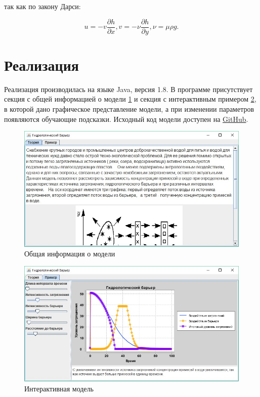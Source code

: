 		так как по закону Дарси:
		
		\begin{equation}
			u=-v\frac{\partial h}{\partial x}, v=-\nu\frac{\partial h}{\partial y}, \nu=\mu\rho g.
		\end{equation}
	\section{Реализация}
	
		Реализация производилась на языке Java, версия 1.8. В программе присутствует секция с общей информацией о модели \ref{fig:barriertheory} и секция с интерактивным примером \ref{fig:barrierexample}, в которой дано графическое представление модели, а при изменении параметров появляются обучающие подсказки. Исходный код модели доступен на \href{https://github.com/goto1134/mathmodels}{GitHub}.
		
		\begin{figure}[th]
			\centering
			\includegraphics[width=0.7\linewidth]{images/barrier_theory}
			\caption{Общая информация о модели}
			\label{fig:barriertheory}
		\end{figure}
		\begin{figure}[th]
			\centering
			\includegraphics[width=0.7\linewidth]{images/barrier_example}
			\caption{Интерактивная модель}
			\label{fig:barrierexample}
		\end{figure}
		
